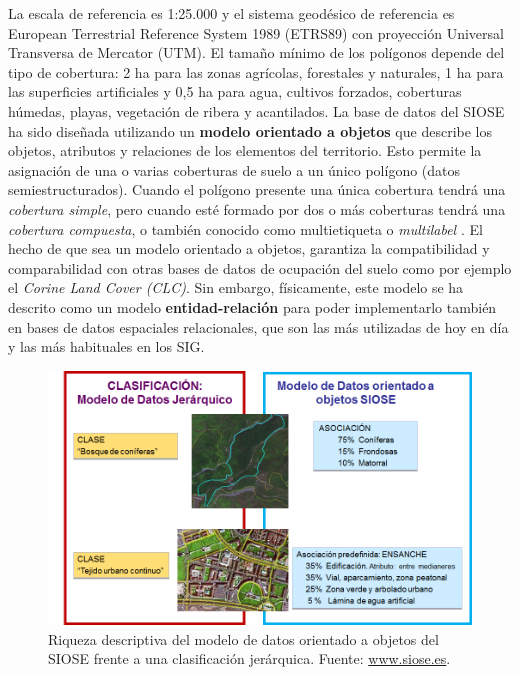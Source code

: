 La escala de referencia es 1:25.000 y el sistema geodésico de referencia es European Terrestrial Reference System 1989 (ETRS89) con proyección Universal Transversa de Mercator (UTM). El tamaño mínimo de los polígonos depende del tipo de cobertura: 2 ha para las zonas agrícolas, forestales y naturales, 1 ha para las superficies artificiales y 0,5 ha para agua, cultivos forzados, coberturas húmedas, playas, vegetación de ribera y acantilados. La base de datos del SIOSE ha sido diseñada utilizando un \textbf{modelo orientado a objetos} que describe los objetos, atributos y relaciones de los elementos del territorio. Esto permite la asignación de una o varias coberturas de suelo a un único polígono (datos semiestructurados). Cuando el polígono presente una única cobertura tendrá una \textit{cobertura simple}, pero cuando esté formado por dos o más coberturas tendrá una \textit{cobertura compuesta}, o también conocido como multietiqueta o \textit{multilabel} \citep{EquipoTecnicoNacionalSIOSE2015}. El hecho de que sea un modelo orientado a objetos, garantiza la compatibilidad y comparabilidad con otras bases de datos de ocupación del suelo como por ejemplo el \textit{Corine Land Cover (CLC)}. Sin embargo, físicamente, este modelo se ha descrito como un modelo \textbf{entidad-relación} para poder implementarlo también en bases de datos espaciales relacionales, que son las más utilizadas de hoy en día y las más habituales en los SIG.

\begin{figure}
\includegraphics[width=\textwidth]{Introduccion/Figs/siose-oo.png}
\caption{Riqueza descriptiva del modelo de datos orientado a objetos del SIOSE frente a una clasificación jerárquica. Fuente: \url{www.siose.es}.\label{fig:siose-oo}}
\end{figure}

